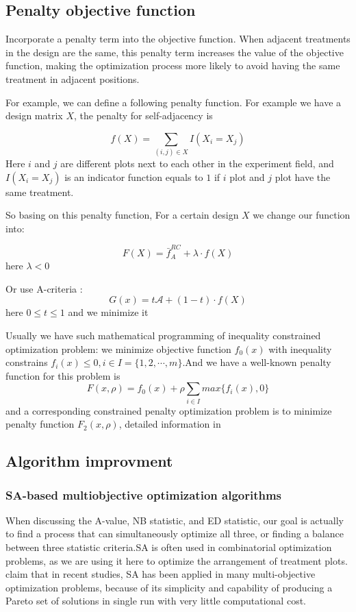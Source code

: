\documentclass[
  a4paper,
  oneside,
  openany,
  12pt,
  onecolumn]{book}
\theoremstyle{plain}
\theoremstyle{definition}
\theoremstyle{remark}
\begin{document}
\subsection{Penalty objective
function}\label{penalty-objective-function}

Incorporate a penalty term into the objective function. When adjacent
treatments in the design are the same, this penalty term increases the
value of the objective function, making the optimization process more
likely to avoid having the same treatment in adjacent positions.

For example, we can define a following penalty function. For example we
have a design matrix \(X\), the penalty for self-adjacency is

\[
f(X) = \sum_{(i,j)\in X}I(X_i = X_j)
\] Here \(i\) and \(j\) are different plots next to each other in the
experiment field, and \(I(X_i = X_j)\) is an indicator function equals
to \(1\) if \(i\) plot and \(j\) plot have the same treatment.

So basing on this penalty function, For a certain design \(X\) we change
our function into:

\[
F(X) = \bar{f}_A^{RC} + \lambda \cdot f(X)
\] here \(\lambda < 0\)

Or use A-criteria : \[
G(x) = t\mathscr{A} + (1-t)\cdot f(X)
\] here \(0\leq t \leq 1\) and we minimize it

Usually we have such mathematical programming of inequality constrained
optimization problem: we minimize objective function \(f_0(x)\) with
inequality constrains \(f_i(x)\leq 0, i\in I=\{1,2,\cdots,m\}\).And we
have a well-known penalty function for this problem is \[
F (x, \rho) = f_0(x) + \rho \sum_{i\in I}max\{f_i(x),0\}
\] and a corresponding constrained penalty optimization problem is to
minimize penalty function \(F_2 (x, \rho)\), detailed information in
\citet{meng2013exactness}

\subsection{Algorithm improvment}\label{algorithm-improvment}

\subsubsection{SA-based multiobjective optimization
algorithms}\label{sa-based-multiobjective-optimization-algorithms}

When discussing the A-value, NB statistic, and ED statistic, our goal is
actually to find a process that can simultaneously optimize all three,
or finding a balance between three statistic criteria.SA is often used
in combinatorial optimization problems, as we are using it here to
optimize the arrangement of treatment plots. \citet{suman2006survey}
claim that in recent studies, SA has been applied in many
multi-objective optimization problems, because of its simplicity and
capability of producing a Pareto set of solutions in single run with
very little computational cost.
\end{document}
